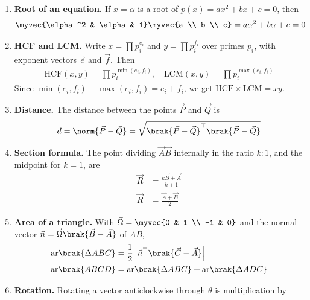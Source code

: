 \begin{enumerate}[label=\thesubsection.\arabic*, ref=\thesubsection.\theenumi, itemsep=0pt]
\item \textbf{Root of an equation.} If $x = \alpha$ is a root of $p(x) = ax^2 + bx + c = 0$, then
\begin{align}
\myvec{\alpha^2 & \alpha & 1}\myvec{a \\ b \\ c} = a\alpha^2 + b\alpha + c = 0
\label{eq:EE26BTECH11225-root}
\end{align}
\item \textbf{HCF and LCM.} Write $x = \prod p_i^{e_i}$ and $y = \prod p_i^{f_i}$ over primes $p_i$, with exponent vectors $\vec{e}$ and $\vec{f}$. Then
\begin{align}
\text{HCF}(x,y) = \prod p_i^{\min(e_i, f_i)}, \quad \text{LCM}(x,y) = \prod p_i^{\max(e_i, f_i)}
\label{eq:EE26BTECH11225-hcf-lcm}
\end{align}
\solution Since $\min(e_i, f_i) + \max(e_i, f_i) = e_i + f_i$, we get $\text{HCF} \times \text{LCM} = xy$.
\item \textbf{Distance.} The distance between the points $\vec{P}$ and $\vec{Q}$ is
\begin{align}
d = \norm{\vec{P} - \vec{Q}} = \sqrt{\brak{\vec{P}-\vec{Q}}^{\top}\brak{\vec{P}-\vec{Q}}}
\label{eq:EE26BTECH11225-distance}
\end{align}
\item \textbf{Section formula.} The point dividing $\vec{A}\vec{B}$ internally in the ratio $k:1$, and the midpoint for $k = 1$, are
\begin{align}
\vec{R} &= \frac{k\vec{B} + \vec{A}}{k + 1}
\label{eq:EE26BTECH11225-section} \\
\vec{R} &= \frac{\vec{A} + \vec{B}}{2}
\label{eq:EE26BTECH11225-midpoint}
\end{align}
\item \textbf{Area of a triangle.} With $\vec{\Omega} = \myvec{0 & 1 \\ -1 & 0}$ and the normal vector $\vec{n} = \vec{\Omega}\brak{\vec{B}-\vec{A}}$ of $AB$,
\begin{align}
\text{ar}\brak{\Delta ABC} &= \frac{1}{2}\left|\vec{n}^{\top}\brak{\vec{C}-\vec{A}}\right|
\label{eq:EE26BTECH11225-area-triangle} \\
\text{ar}\brak{ABCD} &= \text{ar}\brak{\Delta ABC} + \text{ar}\brak{\Delta ADC}
\label{eq:EE26BTECH11225-area-quad}
\end{align}
\item \textbf{Rotation.} Rotating a vector anticlockwise through $\theta$ is multiplication by

\end{enumerate}
